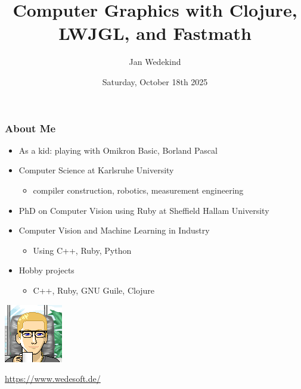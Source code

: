 \documentclass[aspectratio=169,11pt,xcolor=dvipsnames]{beamer}
\title{Computer Graphics with Clojure, LWJGL, and Fastmath}
\author{Jan Wedekind}
\date{Saturday, October 18th 2025}
\begin{document}
\begin{frame}
  \titlepage{}
\end{frame}

\begin{frame}
  \frametitle{About Me}
  \begin{minipage}[b]{0.79\textwidth}
    \begin{itemize}
      \item As a kid: playing with Omikron Basic, Borland Pascal
      \item Computer Science at Karlsruhe University
        \begin{itemize}
          \item compiler construction, robotics, measurement engineering
        \end{itemize}
      \item PhD on Computer Vision using Ruby at Sheffield Hallam University
      \item Computer Vision and Machine Learning in Industry
        \begin{itemize}
          \item Using C++, Ruby, Python
        \end{itemize}
      \item Hobby projects
        \begin{itemize}
          \item C++, Ruby, GNU Guile, Clojure
        \end{itemize}
    \end{itemize}
  \end{minipage}
  \begin{minipage}[b]{0.2\textwidth}
    \includegraphics[width=\textwidth]{avatar}\\
    \begin{tiny}
      \url{https://www.wedesoft.de/}
    \end{tiny}
  \end{minipage}
\end{frame}
\end{document}
